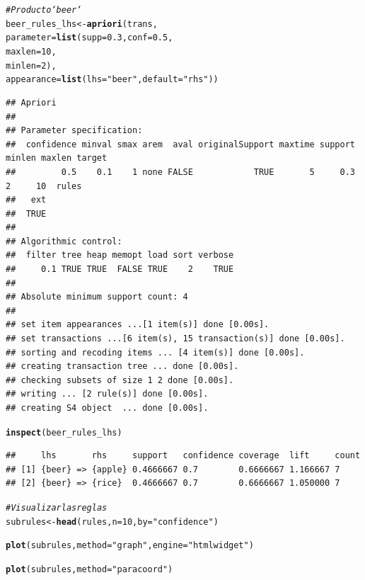 \documentclass{article}\usepackage[]{graphicx}\usepackage[]{xcolor}
\makeatletter
\newcommand{\hlnum}[1]{\textcolor[rgb]{0.686,0.059,0.569}{#1}}%
\newcommand{\hlstr}[1]{\textcolor[rgb]{0.192,0.494,0.8}{#1}}%
\newcommand{\hlcom}[1]{\textcolor[rgb]{0.678,0.584,0.686}{\textit{#1}}}%
\newcommand{\hlstd}[1]{\textcolor[rgb]{0.345,0.345,0.345}{#1}}%
\newcommand{\hlkwb}[1]{\textcolor[rgb]{0.69,0.353,0.396}{#1}}%
\newcommand{\hlkwc}[1]{\textcolor[rgb]{0.333,0.667,0.333}{#1}}%
\newcommand{\hlkwd}[1]{\textcolor[rgb]{0.737,0.353,0.396}{\textbf{#1}}}%
\newenvironment{kframe}{%
 \def\at@end@of@kframe{}%
 \ifinner\ifhmode%
  \def\at@end@of@kframe{\end{minipage}}%
  \begin{minipage}{\columnwidth}%
 \fi\fi%
 \def\FrameCommand##1{\hskip\@totalleftmargin \hskip-\fboxsep
 \colorbox{shadecolor}{##1}\hskip-\fboxsep
     \hskip-\linewidth \hskip-\@totalleftmargin \hskip\columnwidth}%
 \MakeFramed {\advance\hsize-\width
   \@totalleftmargin\z@ \linewidth\hsize
   \@setminipage}}%
 {\par\unskip\endMakeFramed%
 \at@end@of@kframe}
\newenvironment{knitrout}{}{} %
\makeatother
\begin{document}
\begin{knitrout}
\begin{kframe}
\begin{verbatim}
\end{verbatim}
\begin{alltt}
\hlcom{# Producto `beer`}
\hlstd{beer_rules_lhs} \hlkwb{<-} \hlkwd{apriori}\hlstd{(trans,}
                          \hlkwc{parameter} \hlstd{=} \hlkwd{list}\hlstd{(}\hlkwc{supp}\hlstd{=}\hlnum{0.3}\hlstd{,} \hlkwc{conf}\hlstd{=}\hlnum{0.5}\hlstd{,}
                                           \hlkwc{maxlen}\hlstd{=}\hlnum{10}\hlstd{,}
                                           \hlkwc{minlen}\hlstd{=}\hlnum{2}\hlstd{),}
                          \hlkwc{appearance} \hlstd{=} \hlkwd{list}\hlstd{(}\hlkwc{lhs}\hlstd{=}\hlstr{"beer"}\hlstd{,} \hlkwc{default}\hlstd{=}\hlstr{"rhs"}\hlstd{))}
\end{alltt}
\begin{verbatim}
## Apriori
## 
## Parameter specification:
##  confidence minval smax arem  aval originalSupport maxtime support minlen maxlen target
##         0.5    0.1    1 none FALSE            TRUE       5     0.3      2     10  rules
##   ext
##  TRUE
## 
## Algorithmic control:
##  filter tree heap memopt load sort verbose
##     0.1 TRUE TRUE  FALSE TRUE    2    TRUE
## 
## Absolute minimum support count: 4 
## 
## set item appearances ...[1 item(s)] done [0.00s].
## set transactions ...[6 item(s), 15 transaction(s)] done [0.00s].
## sorting and recoding items ... [4 item(s)] done [0.00s].
## creating transaction tree ... done [0.00s].
## checking subsets of size 1 2 done [0.00s].
## writing ... [2 rule(s)] done [0.00s].
## creating S4 object  ... done [0.00s].
\end{verbatim}
\begin{alltt}
\hlkwd{inspect}\hlstd{(beer_rules_lhs)}
\end{alltt}
\begin{verbatim}
##     lhs       rhs     support   confidence coverage  lift     count
## [1] {beer} => {apple} 0.4666667 0.7        0.6666667 1.166667 7    
## [2] {beer} => {rice}  0.4666667 0.7        0.6666667 1.050000 7
\end{verbatim}
\begin{alltt}
\hlcom{# Visualizar las reglas}
\hlstd{subrules} \hlkwb{<-} \hlkwd{head}\hlstd{(rules,} \hlkwc{n}\hlstd{=}\hlnum{10}\hlstd{,} \hlkwc{by} \hlstd{=} \hlstr{"confidence"}\hlstd{)}

\hlkwd{plot}\hlstd{(subrules,} \hlkwc{method} \hlstd{=} \hlstr{"graph"}\hlstd{,}  \hlkwc{engine} \hlstd{=} \hlstr{"htmlwidget"}\hlstd{)}
\end{alltt}


{\ttfamily\noindent\bfseries\color{errorcolor}{\#\# Error: package 'webshot' was installed before R 4.0.0: please re-install it}}\begin{alltt}
\hlkwd{plot}\hlstd{(subrules,} \hlkwc{method}\hlstd{=}\hlstr{"paracoord"}\hlstd{)}
\end{alltt}
\end{kframe}


\end{knitrout}
\end{document}
